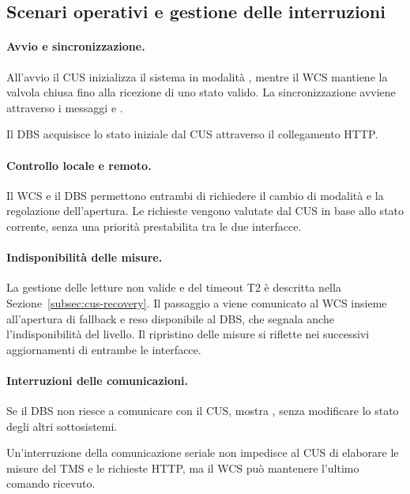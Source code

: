 \FloatBarrier%

\subsection{Scenari operativi e gestione delle interruzioni}%
\label{subsec:integration-scenarios}

\paragraph{Avvio e sincronizzazione.}

All'avvio il CUS inizializza il sistema in modalità , mentre il WCS mantiene la valvola chiusa fino alla ricezione di uno stato valido.
La sincronizzazione avviene attraverso i messaggi  e .

Il DBS acquisisce lo stato iniziale dal CUS attraverso il collegamento HTTP.

\paragraph{Controllo locale e remoto.}

Il WCS e il DBS permettono entrambi di richiedere il cambio di modalità e la regolazione dell'apertura.
Le richieste vengono valutate dal CUS in base allo stato corrente, senza una priorità prestabilita tra le due interfacce.

\paragraph{Indisponibilità delle misure.}

La gestione delle letture non valide e del timeout T2 è descritta nella Sezione~\ref{subsec:cus-recovery}.
Il passaggio a  viene comunicato al WCS insieme all'apertura di fallback e reso disponibile al DBS, che segnala anche l'indisponibilità del livello.
Il ripristino delle misure si riflette nei successivi aggiornamenti di entrambe le interfacce.

\paragraph{Interruzioni delle comunicazioni.}

Se il DBS non riesce a comunicare con il CUS, mostra , senza modificare lo stato degli altri sottosistemi.

Un'interruzione della comunicazione seriale non impedisce al CUS di elaborare le misure del TMS e le richieste HTTP, ma il WCS può mantenere l'ultimo comando ricevuto.

